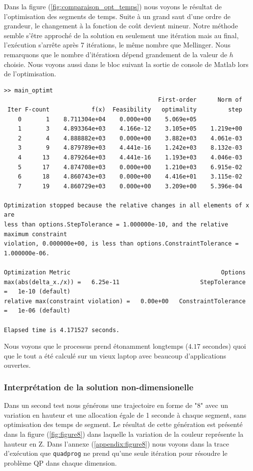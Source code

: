 Dans la figure (\ref{fig:comparaison_opt_temps}) nous voyons le résultat de l'optimisation des segments de temps. Suite à un grand saut d'une ordre de grandeur, le changement à la fonction de coût devient mineur. 
Notre méthode semble s'être approché de la solution en seulement une itération mais au final, l'exécution s'arrête après 7 itérations, le même nombre que Mellinger. Nous remarquons que le nombre d'itératiosn dépend grandement de la valeur de $h$ choisie. Nous voyons aussi dans le bloc suivant la sortie de console de Matlab lors de l'optimisation.

\begin{verbatim}
>> main_optimt
                                            First-order      Norm of
 Iter F-count            f(x)  Feasibility   optimality         step
    0       1    8.711304e+04    0.000e+00    5.069e+05
    1       3    4.893364e+03    4.166e-12    3.105e+05    1.219e+00
    2       4    4.888882e+03    0.000e+00    3.882e+03    4.061e-03
    3       9    4.879789e+03    4.441e-16    1.242e+03    8.132e-03
    4      13    4.879264e+03    4.441e-16    1.193e+03    4.046e-03
    5      17    4.874708e+03    0.000e+00    1.210e+03    6.915e-02
    6      18    4.860743e+03    0.000e+00    4.416e+01    3.115e-02
    7      19    4.860729e+03    0.000e+00    3.209e+00    5.396e-04

Optimization stopped because the relative changes in all elements of x are
less than options.StepTolerance = 1.000000e-10, and the relative maximum constraint
violation, 0.000000e+00, is less than options.ConstraintTolerance = 1.000000e-06.

Optimization Metric                                           Options
max(abs(delta_x./x)) =   6.25e-11                       StepTolerance =   1e-10 (default)
relative max(constraint violation) =   0.00e+00   ConstraintTolerance =   1e-06 (default)

Elapsed time is 4.171527 seconds.
\end{verbatim}

Nous voyons que le processus prend étonamment longtemps ($4.17$ secondes) quoi que le tout a été calculé sur un vieux laptop avec beaucoup d'applications ouvertes.

\subsubsection{Interprétation de la solution non-dimensionelle}
\label{sec:nondim}
Dans un second test nous générons une trajectoire en forme de "8" avec un variation en hauteur et une allocation égale de 1 seconde à chaque segment, sans optimisation des temps de segment. Le résultat de cette génération est présenté dans la figure (\ref{fig:figure8}) dans laquelle la variation de la couleur représente la hauteur en Z. Dans l'annexe (\ref{appendix:figure8}) nous voyons dans la trace d'exécution que \texttt{quadprog} ne prend qu'une seule itération pour résoudre le problème QP dans chaque dimension. 


